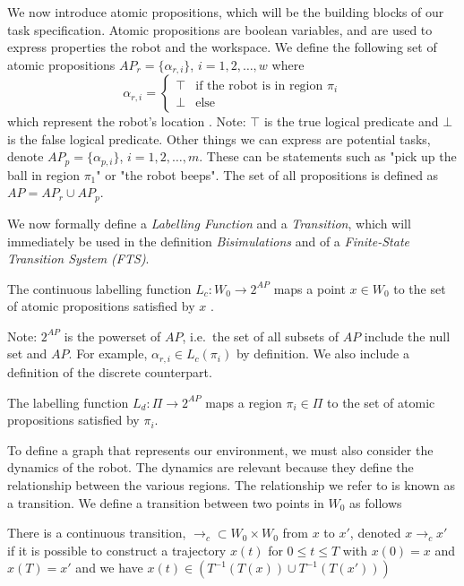 We now introduce atomic propositions, which will be the building blocks of our task specification. Atomic propositions are boolean variables, and are used to express properties the robot and the workspace. We define the following set of atomic propositions $AP_r = \{\alpha_{r,i}\}$, $i=1,2,\dots,w$ where 
\[\alpha_{r,i} =  \begin{cases}
\top & \text{if the robot is in region $\pi_i$} \\
\bot & \text{else}
\end{cases}
\]
which represent the robot's location \cite{guo15}. Note: $\top$ is the true logical predicate and $\bot$ is the false logical predicate. Other things we can express are potential tasks, denote $AP_p = \{\alpha_{p,i}\}$, $i=1,2,\dots,m$. These can be statements such as "pick up the ball in region $\pi_1$" or "the robot beeps". The set of all propositions is defined as $AP = AP_r \cup AP_p$.

We now formally define a \textit{Labelling Function} and a \textit{Transition}, which will immediately be used in the definition \textit{Bisimulations} and of a \textit{Finite-State Transition System (FTS)}. 
\theoremstyle{definition}
\begin{definition}
\label{defCLF}
The continuous labelling function $L_c:W_0 \rightarrow 2^{AP}$ maps a point $x \in W_0$ to the set of atomic propositions satisfied by $x$ \cite{guo15}.
\end{definition} 
Note: $2^{AP}$ is the powerset of $AP$, i.e.\ the set of all subsets of $AP$ include the null set and $AP$. For example, $\alpha_{r,i} \in L_c(\pi_i)$ by definition. 
We also include a definition of the discrete counterpart. 

\theoremstyle{definition}
\begin{definition}
\label{defDLF}
The labelling function $L_d:\Pi\rightarrow 2^{AP}$ maps a region $\pi_i \in \Pi$ to the set of atomic propositions satisfied by $\pi_i$.
\end{definition} 


To define a graph that represents our environment, we must also consider the dynamics of the robot. The dynamics are relevant because they define the relationship between the various regions. The relationship we refer to is known as a transition. We define a transition between two points in $W_0$ as follows
\theoremstyle{definition}
\begin{definition}
\label{defCTransition}
There is a continuous transition, $\rightarrow_c \subset W_0 \times W_0$ from $x$ to $x'$, denoted $x \rightarrow_c x'$ if it is possible to construct a trajectory $x(t)$ for $0 \leq t \leq T$ with $x(0)=x$ and $x(T) =x'$ and we have $x(t) \in (T^{-1}(T(x))\cup T^{-1}(T(x')))$ \cite{fainekos09}
\end{definition}

